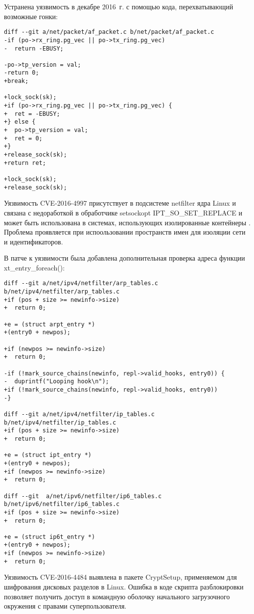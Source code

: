 Устранена уязвимость в декабре 2016~г. с помощью кода, перехватывающий возможные гонки:
\begin{lstlisting}
diff --git a/net/packet/af_packet.c b/net/packet/af_packet.c
-if (po->rx_ring.pg_vec || po->tx_ring.pg_vec)
-  return -EBUSY;

-po->tp_version = val;
-return 0;
+break;

+lock_sock(sk);
+if (po->rx_ring.pg_vec || po->tx_ring.pg_vec) {
+  ret = -EBUSY;
+} else {
+  po->tp_version = val;
+  ret = 0;
+}
+release_sock(sk);
+return ret;

+lock_sock(sk);
+release_sock(sk);
\end{lstlisting}

Уязвимость CVE-2016-4997 присутствует в подсистеме netfilter ядра Linux и связана с недоработкой в обработчике setsockopt IPT\_SO\_SET\_REPLACE и может быть использована в системах, использующих изолированные контейнеры \cite{netf}.
Проблема проявляется при испоользовании пространств имен для изоляции сети и идентификаторов.

В патче к уязвимости была добавлена дополнительная проверка адреса функции xt\_entry\_foreach():
\begin{lstlisting}
diff --git a/net/ipv4/netfilter/arp_tables.c b/net/ipv4/netfilter/arp_tables.c
+if (pos + size >= newinfo->size)
+  return 0;

+e = (struct arpt_entry *)
+(entry0 + newpos);

+if (newpos >= newinfo->size)
+  return 0;

-if (!mark_source_chains(newinfo, repl->valid_hooks, entry0)) {
-  duprintf("Looping hook\n");
+if (!mark_source_chains(newinfo, repl->valid_hooks, entry0))
-}

diff --git a/net/ipv4/netfilter/ip_tables.c b/net/ipv4/netfilter/ip_tables.c
+if (pos + size >= newinfo->size)
+  return 0;

+e = (struct ipt_entry *)
+(entry0 + newpos);
+if (newpos >= newinfo->size)
+  return 0;

diff --git  a/net/ipv6/netfilter/ip6_tables.c b/net/ipv6/netfilter/ip6_tables.c
+if (pos + size >= newinfo->size)
+  return 0;

+e = (struct ip6t_entry *)
+(entry0 + newpos);
+if (newpos >= newinfo->size)
+  return 0;
\end{lstlisting}

Уязвимость CVE-2016-4484 выявлена в пакете CryptSetup, применяемом для шифрования дисковых разделов в Linux.
Ошибка в коде скрипта разблокировки позволяет получить доступ в командную оболочку начального загрузочного окружения с правами суперпользователя.

